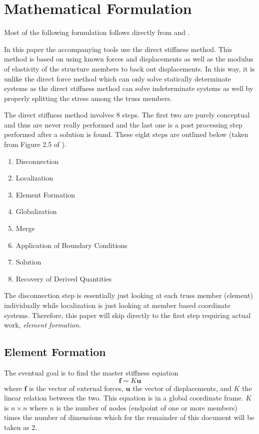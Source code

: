\documentclass{article}
\begin{document}
\section{Mathematical Formulation}

Most of the following formulation follows directly from
\parencite{felippa2004ch2} and \parencite{felippa2004ch3}.

In this paper the accompanying tools use the direct stiffness method.  This
method is based on using known forces and displacements as well as the modulus
of elasticity of the structure members to back out displacements.  In this
way, it is unlike the direct force method which can only solve statically
determinate systems as the direct stiffness method can solve indeterminate
systems as well by properly splitting the stress among the truss members.

The direct stiffness method involves 8 steps.  The first two are purely
conceptual and thus are never really performed and the last one is a post
processing step performed after a solution is found.  These eight steps are
outlined below (taken from Figure 2.5 of \cite{felippa2004ch2}).
\begin{enumerate}[noitemsep]
    \item Disconnection
    \item Localization
    \item Element Formation
    \item Globalization
    \item Merge
    \item Application of Boundary Conditions
    \item Solution
    \item Recovery of Derived Quantities
\end{enumerate}

The disconnection step is essentially just looking at each truss member
(element) individually while localization is just looking at member based
coordinate systems.  Therefore, this paper will skip directly to the first
step requiring actual work, \emph{element formation}.




\subsection{Element Formation}

The eventual goal is to find the master stiffness equation
\begin{equation}
    \mathbf{f}=K\mathbf{u} \label{eq:master_stiffness_equation}
\end{equation}
where $\mathbf{f}$ is the vector of external forces, $\mathbf{u}$ the vector
of displacements, and $K$ the linear relation between the two.  This equation
is in a global coordinate frame.  $K$ is $n\times{}n$ where $n$ is the number
of nodes (endpoint of one or more members) times the number of dimensions
which for the remainder of this document will be taken as 2.
\end{document}
